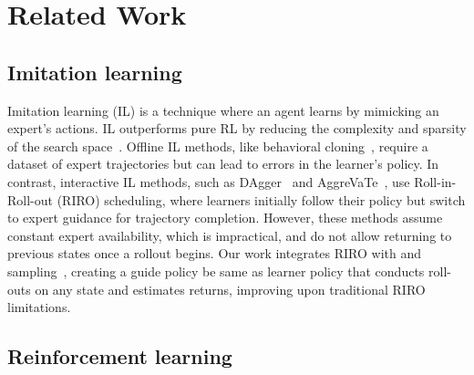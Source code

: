 \section{Related Work}\label{sec:related}










\subsection{Imitation learning}



Imitation learning (IL) is a technique where an agent learns by mimicking an expert's actions. IL outperforms pure RL by reducing the complexity and sparsity of the search space~\citep{liu2023active}. Offline IL methods, like behavioral cloning~\citep{pomerleau1988alvinn}, require a dataset of expert trajectories but can lead to errors in the learner's policy. In contrast, interactive IL methods, such as DAgger~\citep{ross2011reduction} and AggreVaTe~\citep{ross2014reinforcement}, use Roll-in-Roll-out (RIRO) scheduling, where learners initially follow their policy but switch to expert guidance for trajectory completion. However, these methods assume constant expert availability, which is impractical, and do not allow returning to previous states once a rollout begins. Our work integrates RIRO with {\TOPK and \TOPP sampling}~\citep{liu2024erp}, creating a guide policy be same as learner policy that conducts roll-outs on any state and estimates returns, improving upon traditional RIRO limitations.







\subsection{Reinforcement learning} %

